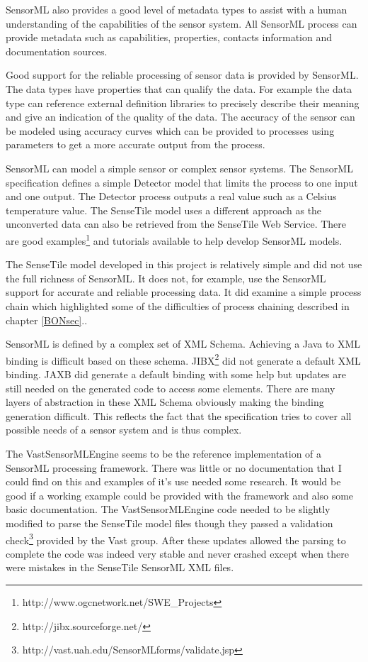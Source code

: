 \documentclass[]{final_report}
\begin{document}
SensorML also provides a good level of metadata types to assist with a human understanding of the capabilities of the sensor system. All SensorML process can provide metadata such as capabilities, properties, contacts information and documentation sources.

Good support for the reliable processing of sensor data is provided by SensorML. The data types have properties that can qualify the data. For example the data type can reference external definition libraries to precisely describe their meaning and give an indication of the quality of the data. The accuracy of the sensor can be modeled using accuracy curves which can be provided to processes using parameters to get a more accurate output from the process.

SensorML can model a simple sensor or complex sensor systems. The SensorML specification defines a simple Detector model that limits the process to one input and one output. The Detector process outputs a real value such as a Celsius temperature value. The SenseTile model uses a different approach as the unconverted data can also be retrieved from the SenseTile Web Service. There are good examples\footnote{http://www.ogcnetwork.net/SWE\_Projects} and tutorials \cite{SMLTutorialref} available to help develop SensorML models. 

The SenseTile model developed in this project is relatively simple and did not use the full richness of SensorML. It does not, for example, use the SensorML support for accurate and reliable processing data. It did examine a simple process chain which highlighted some of the difficulties of process chaining described in chapter \ref{BONsec}..

SensorML is defined by a complex set of XML Schema. Achieving a Java to XML binding is difficult based on these schema. JIBX\footnote{http://jibx.sourceforge.net/} did not generate a default XML binding. JAXB did generate a default binding with some help but updates are still needed on the generated code to access some elements. There are many layers of abstraction in these XML Schema obviously making the binding generation difficult. This reflects the fact that the specification tries to cover all possible needs of a sensor system and is thus complex. 

The VastSensorMLEngine seems to be the reference implementation of a SensorML processing framework. There was little or no documentation that I could find on this and examples of it's use needed some research. It would be good if a working example could be provided with the framework and also some basic documentation. The VastSensorMLEngine code needed to be slightly modified to parse the SenseTile model files though they passed a validation check\footnote{http://vast.uah.edu/SensorMLforms/validate.jsp} provided by the Vast group. After these updates allowed the parsing to complete the code was indeed very stable and never crashed except when there were mistakes in the SenseTile SensorML XML files.
\end{document}

